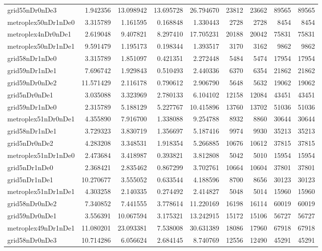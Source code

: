 \begin{longtable}{|l|r|r|r|r|r|r|r|r|}
grid55nDr0nDe3 & 1.942356 & 13.098942 & 13.695728 & 26.794670 & 23812 & 23662 & 89565 & 89565 \\
metroplex50nDr1nDe0 & 3.315789 & 1.161595 & 0.168848 & 1.330443 & 2728 & 2728 & 8454 & 8454 \\
metroplex4nDr0nDe1 & 2.619048 & 9.407821 & 8.297410 & 17.705231 & 20188 & 20042 & 75831 & 75831 \\
metroplex50nDr1nDe1 & 9.591479 & 1.195173 & 0.198344 & 1.393517 & 3170 & 3162 & 9862 & 9862 \\
grid58nDr1nDe0 & 3.315789 & 1.851097 & 0.421351 & 2.272448 & 5484 & 5474 & 17954 & 17954 \\
grid59nDr1nDe1 & 7.696742 & 1.929843 & 0.510493 & 2.440336 & 6370 & 6354 & 21862 & 21862 \\
grid59nDr0nDe2 & 11.571429 & 2.116178 & 0.790612 & 2.906790 & 5648 & 5632 & 19062 & 19062 \\
grid5nDr0nDe1 & 3.035088 & 3.323969 & 2.780133 & 6.104102 & 12158 & 12084 & 43451 & 43451 \\
grid59nDr1nDe0 & 2.315789 & 5.188129 & 5.227767 & 10.415896 & 13760 & 13702 & 51036 & 51036 \\
metroplex51nDr0nDe1 & 4.355890 & 7.916700 & 1.338088 & 9.254788 & 8932 & 8860 & 30644 & 30644 \\
grid58nDr1nDe1 & 3.729323 & 3.830719 & 1.356697 & 5.187416 & 9974 & 9930 & 35213 & 35213 \\
grid5nDr0nDe2 & 4.283208 & 3.348531 & 1.918354 & 5.266885 & 10676 & 10612 & 37815 & 37815 \\
metroplex51nDr1nDe0 & 2.473684 & 3.418987 & 0.393821 & 3.812808 & 5042 & 5010 & 15954 & 15954 \\
grid5nDr1nDe0 & 2.368421 & 2.835462 & 0.867299 & 3.702761 & 10664 & 10604 & 37801 & 37801 \\
grid5nDr1nDe1 & 10.270677 & 3.555052 & 0.633544 & 4.188596 & 8700 & 8656 & 30123 & 30123 \\
metroplex51nDr1nDe1 & 4.303258 & 2.140335 & 0.274492 & 2.414827 & 5048 & 5014 & 15960 & 15960 \\
grid58nDr0nDe2 & 7.340852 & 7.441555 & 3.778614 & 11.220169 & 16198 & 16114 & 60019 & 60019 \\
grid59nDr0nDe1 & 3.556391 & 10.067594 & 3.175321 & 13.242915 & 15172 & 15106 & 56727 & 56727 \\
metroplex49nDr1nDe1 & 11.080201 & 23.093381 & 7.538008 & 30.631389 & 18086 & 17960 & 67918 & 67918 \\
grid58nDr0nDe3 & 10.714286 & 6.056624 & 2.684145 & 8.740769 & 12556 & 12490 & 45291 & 45291 \\

\end{longtable}
